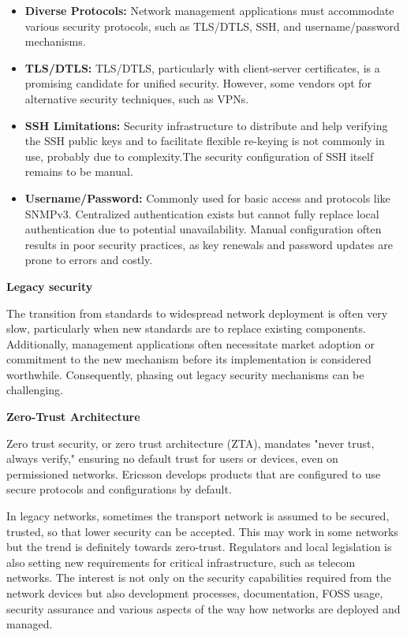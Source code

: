 \documentclass[10pt,sigconf]{iabart}
\begin{document}
\begin{itemize}
    \item \textbf{Diverse Protocols:} Network management applications must accommodate various security protocols, such as TLS/DTLS, SSH, and username/password mechanisms.
    \item \textbf{TLS/DTLS:} TLS/DTLS, particularly with client-server certificates, is a promising candidate for unified security. However, some vendors opt for alternative security techniques, such as VPNs.
    \item \textbf{SSH Limitations:} Security infrastructure to distribute and help verifying the SSH public keys and to facilitate flexible re-keying is not commonly in use, probably due to complexity.The security configuration of SSH itself remains to be manual.
    \item \textbf{Username/Password:} Commonly used for basic access and protocols like SNMPv3. Centralized authentication exists but cannot fully replace local authentication due to potential unavailability. Manual configuration often results in poor security practices, as key renewals and password updates are prone to errors and costly.

\end{itemize}
 
\textbf{Legacy security}

The transition from standards to widespread network deployment is often very slow, particularly when new standards are to replace existing components. Additionally, management applications often necessitate market adoption or commitment to the new mechanism before its implementation is considered worthwhile. Consequently, phasing out legacy security mechanisms can be challenging.
 
\textbf{Zero-Trust Architecture}

Zero trust security, or zero trust architecture (ZTA), mandates "never trust, always verify," ensuring no default trust for users or devices, even on permissioned networks. Ericsson develops products that are configured to use secure protocols and configurations by default. 

In legacy networks, sometimes the transport network is assumed to be secured, trusted, so that lower security can be accepted. This may work in some networks but the trend is definitely towards zero-trust. Regulators and local legislation is also setting new requirements for critical infrastructure, such as telecom networks. The interest is not only on the security capabilities required from the network devices but also development processes, documentation, FOSS usage, security assurance and various aspects of the way how networks are deployed and managed.
\end{document}
